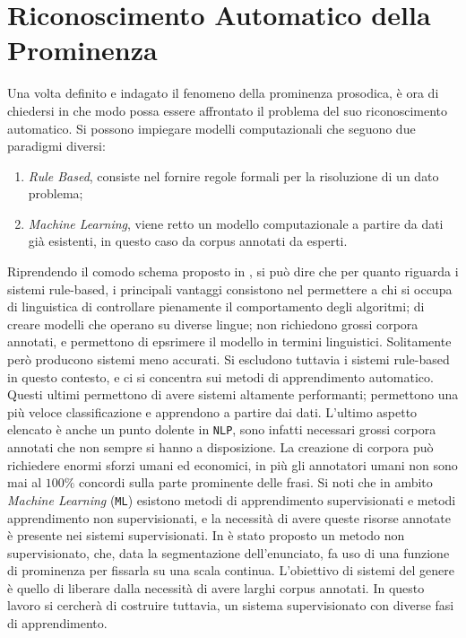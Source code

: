\documentclass[twoside,twocolumn,11pt]{extarticle}
\theoremstyle{definition}
\begin{document}
\section{Riconoscimento Automatico della Prominenza}\label{sec:ric}
	Una volta definito e indagato il fenomeno della prominenza prosodica, è ora di chiedersi in che modo possa essere affrontato il problema del suo riconoscimento automatico. Si possono impiegare modelli computazionali che seguono due paradigmi diversi:
	\begin{enumerate}
		\item \textit{Rule Based}, consiste nel fornire regole formali per la risoluzione di un dato problema;
		\item \textit{Machine Learning}, viene retto un modello computazionale a partire da dati già esistenti, in questo caso da corpus annotati da esperti. 
	\end{enumerate}
	Riprendendo il comodo schema proposto in \cite{bib:prominence-by-acoustic-analyses}, si può dire che per quanto riguarda i sistemi rule-based, i principali vantaggi consistono nel permettere a chi si occupa di linguistica di controllare pienamente il comportamento degli algoritmi; di creare modelli che operano su diverse lingue; non richiedono grossi corpora annotati, e permettono di epsrimere il modello in termini linguistici. Solitamente però producono sistemi meno accurati. Si escludono tuttavia i sistemi rule-based in questo contesto, e ci si concentra sui metodi di apprendimento automatico. Questi ultimi permettono di avere sistemi altamente performanti; permettono una più veloce classificazione e apprendono a partire dai dati. L'ultimo aspetto elencato è anche un punto dolente in \texttt{NLP}, sono infatti necessari grossi corpora annotati che non sempre si hanno a disposizione. La creazione di corpora può richiedere enormi sforzi umani ed economici, in più gli annotatori umani non sono mai al $100\%$ concordi sulla parte prominente delle frasi. Si noti che in ambito \textit{Machine Learning} (\texttt{ML}) esistono metodi di apprendimento supervisionati e metodi apprendimento non supervisionati, e la necessità di avere queste risorse annotate è presente nei sistemi supervisionati. In \cite[Sezione 4.2]{bib:fenomeni-prosodici-prominenza} è stato proposto un metodo non supervisionato, che, data la segmentazione dell'enunciato, fa uso di una funzione di prominenza per fissarla su una scala continua. L'obiettivo di sistemi del genere è quello di liberare dalla necessità di avere larghi corpus annotati. In questo lavoro si cercherà di costruire tuttavia, un sistema supervisionato con diverse fasi di apprendimento. 
	
\end{document}
